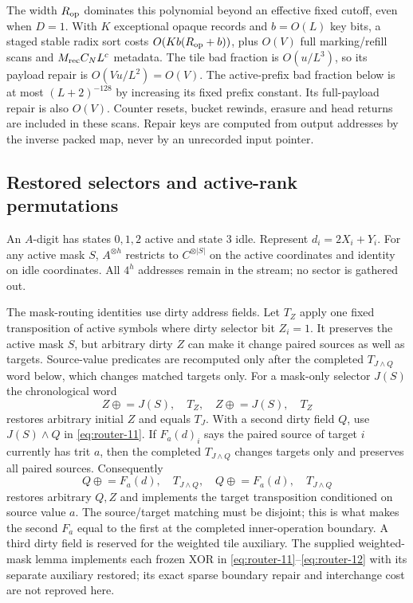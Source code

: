 The width $R_{\rm op}$ dominates this polynomial beyond an effective
fixed cutoff, even when $D=1$. With $K$ exceptional opaque records
and $b=O(L)$ key bits, a staged stable radix sort costs
$O(Kb(R_{\rm op}+b))$, plus $O(V)$ full marking/refill scans and
$M_{\rm rec}C_NL^c$ metadata. The tile bad fraction is $O(u/L^3)$,
so its payload repair is $O(Vu/L^2)=O(V)$. The active-prefix bad
fraction below is at most $(L+2)^{-128}$ by increasing its fixed
prefix constant. Its full-payload repair is also $O(V)$. Counter
resets, bucket rewinds, erasure and head returns are included in
these scans. Repair keys are computed from output addresses by
the inverse packed map, never by an unrecorded input pointer.

\subsection{Restored selectors and active-rank permutations}An $A$-digit has states $0,1,2$ active and state $3$ idle. Represent
$d_i=2X_i+Y_i$. For any active mask $S$, $A^{\otimes h}$ restricts to
$C^{\otimes |S|}$ on the active coordinates and identity on idle
coordinates. All $4^h$ addresses remain in the stream; no sector is
gathered out.

The mask-routing identities use dirty address fields. Let $T_Z$ apply
one fixed transposition of active symbols where dirty selector bit
$Z_i=1$. It preserves the active mask $S$, but arbitrary dirty $Z$
can make it change paired sources as well as targets. Source-value
predicates are recomputed only after the completed $T_{J\wedge Q}$
word below, which changes matched targets only. For a mask-only selector
$J(S)$ the chronological word
\begin{equation}
 Z\mathrel{\oplus}=J(S),\quad T_Z,\quad
 Z\mathrel{\oplus}=J(S),\quad T_Z                         \label{eq:router-11}
\end{equation}
restores arbitrary initial $Z$ and equals $T_J$. With a second dirty
field $Q$, use $J(S)\wedge Q$ in \eqref{eq:router-11}. If $F_a(d)_i$ says the paired
source of target $i$ currently has trit $a$, then the completed
$T_{J\wedge Q}$ changes targets only and preserves all paired sources.
Consequently
\begin{equation}
 Q\mathrel{\oplus}=F_a(d),\quad T_{J\wedge Q},\quad
 Q\mathrel{\oplus}=F_a(d),\quad T_{J\wedge Q}              \label{eq:router-12}
\end{equation}
restores arbitrary $Q,Z$ and implements the target transposition
conditioned on source value $a$. The source/target matching must be
disjoint; this is what makes the second $F_a$ equal to the first at the
completed inner-operation boundary. A third dirty field is reserved for
the weighted tile auxiliary. The supplied weighted-mask lemma implements
each frozen XOR in \eqref{eq:router-11}--\eqref{eq:router-12} with its separate auxiliary restored;
its exact sparse boundary repair and interchange cost are not reproved
here.

